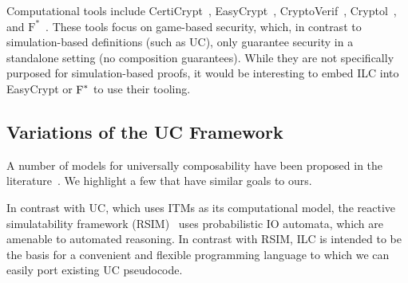 Computational tools include CertiCrypt~\cite{barthe2009formal},
EasyCrypt~\cite{barthe2011computer}, CryptoVerif~\cite{blanchet2007cryptoverif},
Cryptol~\cite{lewis2003cryptol}, and
$\text{F}^{*}$~\cite{swamy2016dependent}. These tools focus on game-based
security, which, in contrast to simulation-based definitions (such as UC), only
guarantee security in a standalone setting (no composition guarantees). While
they are not specifically purposed for simulation-based proofs, it would be
interesting to embed ILC into EasyCrypt or $\textnormal{F}^{*}$ to use their
tooling.


\subsection{Variations of the UC Framework}
\label{subsec:uc-variants}

A number of models for universally composability have been proposed in the
literature~\cite{canetti2001universally,pfitzmann2001model,
  canetti2003universal,backes2007reactive, canetti2008analyzing,
  maurer2011abstract, maurer2011constructive,
  canetti2015simpler,bohl2016symbolic,hofheinz2015gnuc,camenisch2016universal,
  camenischiuc,camenischmulti}. We highlight a few that have similar goals to
ours.


In contrast with UC, which uses ITMs as its computational model, the reactive
simulatability framework (RSIM)~\cite{backes2007reactive} uses probabilistic IO
automata, which are amenable to automated reasoning.  In contrast with RSIM, ILC
is intended to be the basis for a convenient and flexible programming language
to which we can easily port existing UC pseudocode.


